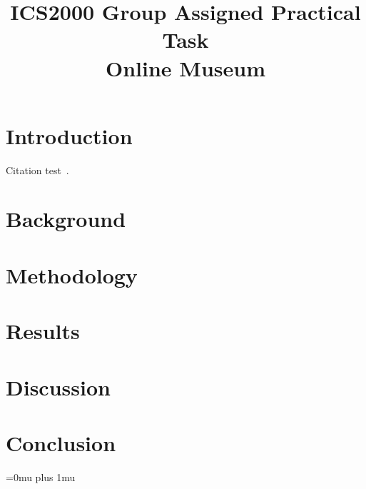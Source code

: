 

\titleformat{\chapter}[display]
  {\normalfont\bfseries}{}{0pt}{\Huge}

\usepackage{enumitem}

\title{\textbf{ICS2000 Group Assigned Practical Task} \\ Online Museum}


\maketitle

\setlength{\columnsep}{1cm}

\begin{multicols*}{2}

\begin{abstract}
  \textit{
    \lipsum[1]
  }
\end{abstract}

\section{Introduction}
Citation test~\cite{klabnik2023rust}.
\lipsum[1]

\section{Background}
\lipsum[1]

\section{Methodology}
\lipsum[1]

\section{Results}
\lipsum[1]

\section{Discussion}
\lipsum[1]

\section{Conclusion}
\lipsum[1]


\newpage


\Urlmuskip=0mu plus 1mu\relax



\end{multicols*}


